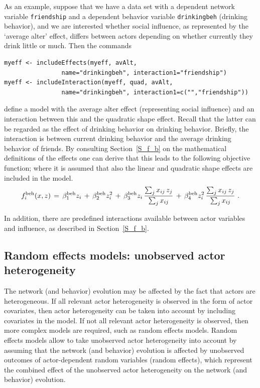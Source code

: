 \documentclass[a4paper,fleqn,11pt]{article}
\newcommand{\+}{\, + \,}
\begin{document}
As an example, suppose that we have a data set with a dependent
network variable \texttt{friendship} and a dependent behavior variable
\texttt{drinkingbeh} (drinking behavior), and we are interested whether
social influence, as represented by the `average alter' effect, differs
between actors depending on whether currently they drink little or much.
Then the commands
\begin{verbatim}
myeff <- includeEffects(myeff, avAlt,
                name="drinkingbeh", interaction1="friendship")
myeff <- includeInteraction(myeff, quad, avAlt,
                name="drinkingbeh", interaction1=c("","friendship"))
\end{verbatim}
define a model with the average alter effect (representing social influence)
and an interaction between this and the quadratic shape effect.
Recall that the latter can be regarded
as the effect of drinking behavior on drinking behavior.
Briefly, the interaction is between current drinking behavior
and the average drinking behavior of friends.
By consulting Section~\ref{S_f_b} on the mathematical definitions of the
effects one can derive that this leads to the following objective function;
where it is assumed that also the linear and quadratic shape effects are
included in the model.
\[
f^{\rm beh}_i(x, z) \,=\, \beta^{\rm beh}_1 z_i \,+\, \beta^{\rm beh}_2 z_i^2
        \,+\, \beta^{\rm beh}_3 z_i \,
        \frac{ \sum_j x_{ij}\, z_j }{\sum_j x_{ij}}
       \,+\, \beta^{\rm beh}_4 z_i^2 \,
              \frac{ \sum_j x_{ij}\, z_j }{\sum_j x_{ij}} \ .
\]
\medskip

In addition, there are predefined interactions available
between actor variables and influence, as described in Section~\ref{S_f_b}.

\iffalse
\subsection{Random effects models: unobserved actor heterogeneity}

The network (and behavior) evolution may be affected
by the fact that actors are heterogeneous.
If all relevant actor heterogeneity is observed in the form of actor
covariates,
then actor heterogeneity can be taken into account by including
covariates in the model.
If not all relevant actor heterogeneity is observed,
then more complex models are required, such as random effects models.
Random effects models \citep[see][]{SchweinbergerSnijders07b} allow to take
unobserved actor heterogeneity into account
by assuming that the network (and behavior) evolution is affected
by unobserved
outcomes of actor-dependent random variables (random effects),
which represent the combined effect of the unobserved actor
heterogeneity on the network (and behavior) evolution.
\end{document}
